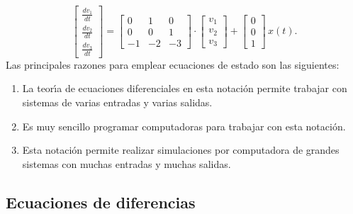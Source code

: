 \begin{equation}
\left[ \begin{array}{c}
\frac{dv_{1}}{dt} \\
\frac{dv_{2}}{dt} \\
\frac{dv_{3}}{dt}
\end{array} \right] 
= \left[ \begin{array}{ccc}
0 & 1 & 0 \\
0 & 0 & 1 \\
-1 & -2 & -3
\end{array} \right] \cdot
\left[ \begin{array}{c}
v_{1}\\
v_{2}\\
v_{3}
\end{array} \right]
+
\left[ \begin{array}{c}
0 \\
0 \\
1
\end{array} \right] \, x(t).
\end{equation}
Las principales razones para emplear ecuaciones de estado son las
siguientes:
\begin{enumerate}
        
\item La teor\'{\i}a de ecuaciones diferenciales en esta notaci\'{o}n
  permite trabajar con sistemas de varias entradas y varias salidas.
        
\item Es muy sencillo programar computadoras para trabajar con esta
  notaci\'{o}n.
        
\item Esta notaci\'{o}n permite realizar simulaciones por computadora
  de grandes sistemas con muchas entradas y muchas salidas.
\end{enumerate}

\subsection{Ecuaciones de diferencias}

